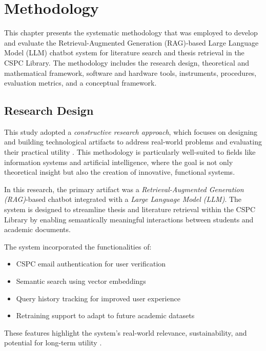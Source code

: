 
\chapter{Methodology}
\begin{refsection}
 
This chapter presents the systematic methodology that was employed to develop and evaluate the Retrieval-Augmented Generation (RAG)-based Large Language Model (LLM) chatbot system for literature search and thesis retrieval in the CSPC Library. The methodology includes the research design, theoretical and mathematical framework, software and hardware tools, instruments, procedures, evaluation metrics, and a conceptual framework.

\section{Research Design}

This study adopted a \textit{constructive research approach}, which focuses on designing and building technological artifacts to address real-world problems and evaluating their practical utility \citeauthor{lukka2003cons} \citeyear{lukka2003cons}. This methodology is particularly well-suited to fields like information systems and artificial intelligence, where the goal is not only theoretical insight but also the creation of innovative, functional systems.

In this research, the primary artifact was a \textit{Retrieval-Augmented Generation (RAG)}-based chatbot integrated with a \textit{Large Language Model (LLM)}. The system is designed to streamline thesis and literature retrieval within the CSPC Library by enabling semantically meaningful interactions between students and academic documents. 

The system incorporated the functionalities of:

\begin{itemize}
    \item CSPC email authentication for user verification
    \item Semantic search using vector embeddings
    \item Query history tracking for improved user experience
    \item Retraining support to adapt to future academic datasets
\end{itemize}


These features highlight the system's real-world relevance, sustainability, and potential for long-term utility \cite{hevner2004design}.


\end{refsection}
